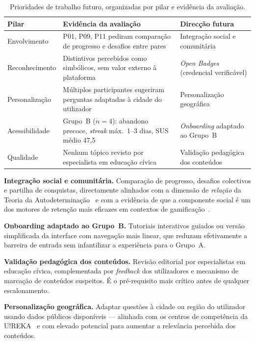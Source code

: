 \begin{table}[ht]
\centering
\small
\begin{tabular}{p{2.8cm}p{5.0cm}p{4.8cm}}
\toprule
\textbf{Pilar} & \textbf{Evidência da avaliação} & \textbf{Direcção futura} \\
\midrule
Envolvimento     & P01, P09, P11 pediram comparação de progresso e desafios entre pares & Integração social e comunitária \\[2pt]
Reconhecimento   & Distintivos percebidos como simbólicos, sem valor externo à plataforma & \emph{Open Badges} (credencial verificável) \\[2pt]
Personalização   & Múltiplos participantes sugeriram perguntas adaptadas à cidade do utilizador & Personalização geográfica \\[2pt]
Acessibilidade   & Grupo~B ($n=4$): abandono precoce, \emph{streak} máx.\ 1--3 dias, SUS médio 47,5 & \emph{Onboarding} adaptado ao Grupo~B \\[2pt]
Qualidade        & Nenhum tópico revisto por especialista em educação cívica & Validação pedagógica dos conteúdos \\
\bottomrule
\end{tabular}
\caption{Prioridades de trabalho futuro, organizadas por pilar e evidência da avaliação.}
\label{tab:trabalho-futuro}
\end{table}

\textbf{Integração social e comunitária.} Comparação de progresso, desafios colectivos e partilha de conquistas, directamente alinhados com a dimensão de \emph{relação} da Teoria da Autodeterminação~\cite{deci1985intrinsic} e com a evidência de que a componente social é um dos motores de retenção mais eficazes em contextos de gamificação~\cite{ott2019gamification}.

\textbf{Onboarding adaptado ao Grupo~B.} Tutoriais interativos guiados ou versão simplificada da interface com navegação mais linear, que reduzam efetivamente a barreira de entrada sem infantilizar a experiência para o Grupo~A.

\textbf{Validação pedagógica dos conteúdos.} Revisão editorial por especialistas em educação cívica, complementada por \emph{feedback} dos utilizadores e mecanismo de marcação de conteúdos suspeitos. É o pré-requisito mais crítico antes de qualquer escalonamento.

\textbf{Personalização geográfica.} Adaptar questões à cidade ou região do utilizador usando dados públicos disponíveis --- alinhada com os centros de competência da U!REKA~\citep{ureka2026alliance} e com elevado potencial para aumentar a relevância percebida dos conteúdos.

